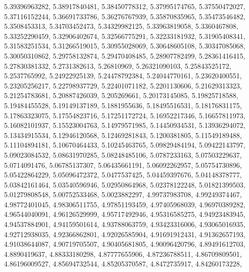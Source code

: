 \begin{code}
\begin{hide}
{     5.39396963282,     5.38917840481,     5.38450778312,
     5.37995174765,     5.37550472027,     5.37116152244,
     5.36691733786,     5.36276767939,     5.35870835965,
     5.35473546482,      5.3508453313,     5.34703452473,
     5.34329982125,     5.33963819058,      5.3360467808,
     5.33252290459,     5.32906402674,     5.32566775291,
     5.32233181932,     5.31905408341,     5.31583251534,
     5.31266519015,     5.30955028069,     5.30648605108,
     5.30347085068,     5.30050310862,     5.29758132874,
     5.29470408485,     5.28907782499,     5.28361416415,
     5.27830381332,      5.2731382613,        5.26810969,
     5.26321090103,     5.25843525172,      5.2537765992,
     5.24922925139,     5.24478792384,     5.24044770161,
     5.23620400551,     5.23205256217,     5.22798937729,
     5.22401071182,      5.2201130606,     5.21629313323,
     5.21254783681,     5.20887426039,       5.205269661,
     5.20173145085,     5.19825718588,     5.19484455528,
     5.19149137189,      5.1881955636,     5.18495516531,
     5.18176831175,     5.17863323075,     5.17554823716,
     5.17251172724,     5.16952217346,     5.16657811973,
     5.16082101937,     5.15523004763,     5.14979571985,
     5.14450934531,     5.13936294072,     5.13434915534,
     5.12946120568,     5.12469281843,      5.1200381805,
     5.11549189488,     5.11104894181,     5.10670464433,
     5.10245463765,     5.09829484194,     5.09422143797,
     5.09023084532,     5.08631970285,     5.08248485106,
      5.0787233163,     5.07503229637,      5.0714091476,
     5.06785137307,     5.06435661191,     5.06092262957,
     5.05754730896,     5.05422864229,     5.05096472372,
      5.0477537425,     5.04459397676,     5.04148378777,
     5.03842161464,     5.03540596946,     5.02950864968,
     5.02378122248,     5.01821399503,     5.01279808548,
     5.00752533468,      5.0023882297,     4.99737983708,
     4.99249374467,     4.98772401045,     4.98306511755,
     4.97851193459,     4.97405968039,     4.96970389282,
     4.96544040091,     4.96126529999,     4.95717492946,
     4.95316585275,     4.94923483945,     4.94537884901,
     4.94159501614,     4.93788063759,     4.93423316006,
     4.93065016935,     4.92712938035,     4.92366862801,
     4.92026585904,     4.91691912431,     4.91362657193,
     4.91038644087,     4.90719705507,     4.90405681805,
     4.90096420796,     4.89491612703,      4.8890419637,
     4.88333180298,     4.87777655906,     4.87236788511,
     4.86709809501,     4.86196009527,     4.85694732544,
     4.85205370587,      4.8472735917,     4.84260173228,
}
\end{hide}
\end{code}
